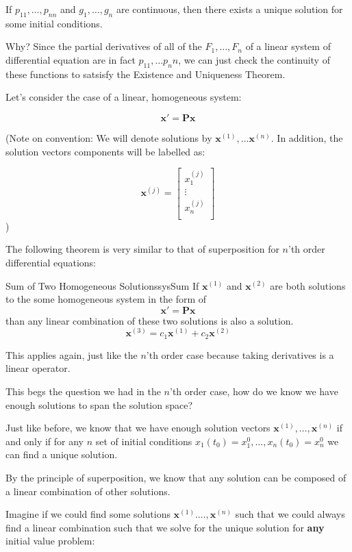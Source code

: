 \documentclass{report}
\begin{document}
If $p_{11}, \dots, p_{nn}$ and $g_1, \dots, g_n$ are continuous, then there exists a unique solution for some initial conditions.

Why?
Since the partial derivatives of all of the $F_1, \dots, F_n$ of a linear system of differential equation are in fact $p_11, \dots p_nn$, we can just check the continuity of these functions to satsisfy the Existence and Uniqueness Theorem.



Let's consider the case of a linear, homogeneous system:


$$\mathbf{x}' = \mathbf{Px}$$


(Note on convention:
We will denote solutions by $\mathbf{x}^{(1)}, \dots \mathbf{x}^{(n)}$. In addition, the solution vectors components will be labelled as:

$$\mathbf{x}^{(j)} = 
\begin{bmatrix}
    x_1^{(j)} \\
    \vdots \\
    x_n^{(j)} \\
\end{bmatrix}
$$
)

The following theorem is very similar to that of superposition for $n$'th order differential equations:

\begin{mytheo}{Sum of Two Homogeneous Solutions}{sysSum}
    If $\mathbf{x}^{(1)}$ and $\mathbf{x}^{(2)}$ are both solutions to the some homogeneous system in the form of
    $$\mathbf{x}' = \mathbf{Px}$$
    than any linear combination of these two solutions is also a solution.
    $$\mathbf{x}^{(3)} = c_1\mathbf{x}^{(1)} + c_2\mathbf{x}^{(2)}$$
\end{mytheo}


This applies again, just like the $n$'th order case because taking derivatives is a linear operator.

This begs the question we had in the $n$'th order case, how do we know we have enough solutions to span the solution space?

Just like before, we know that we have enough solution vectors $\mathbf{x}^{(1)}, \dots, \mathbf{x}^{(n)}$ if and only if for any $n$ set of initial conditions $x_1(t_0) = x_1^0, \dots, x_n(t_0) = x_n^0$ we can find a unique solution.

By the principle of superposition, we know that any solution can be composed of a linear combination of other solutions.

Imagine if we could find some solutions $\mathbf{x}^{(1)}. \dots, \mathbf{x}^{(n)}$ such that we could always find a linear combination such that we solve for the unique solution for \textbf{any} initial value problem:
\end{document}
